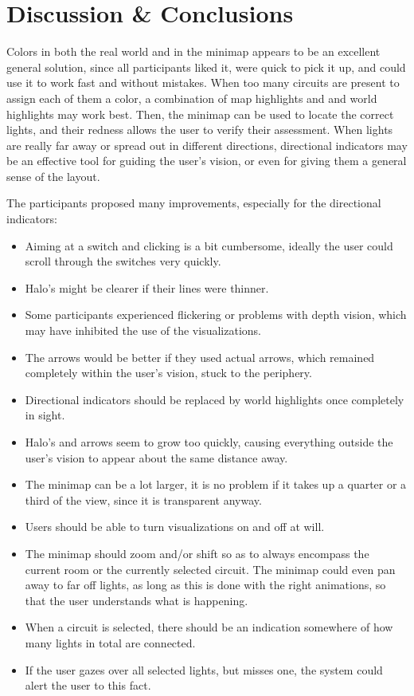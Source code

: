 \section{Discussion \& Conclusions} \label{sec:user:disc_conc}
Colors in both the real world and in the minimap appears to be an excellent general solution, since all participants liked it, were quick to pick it up, and could use it to work fast and without mistakes. When too many circuits are present to assign each of them a color, a combination of map highlights and and world highlights may work best. Then, the minimap can be used to locate the correct lights, and their redness allows the user to verify their assessment. When lights are really far away or spread out in different directions, directional indicators may be an effective tool for guiding the user's vision, or even for giving them a general sense of the layout.

The participants proposed many improvements, especially for the directional indicators:
\begin{itemize}
  \item Aiming at a switch and clicking is a bit cumbersome, ideally the user could scroll through the switches very quickly.
  \item Halo's might be clearer if their lines were thinner.
  \item Some participants experienced flickering or problems with depth vision, which may have inhibited the use of the visualizations.
  \item The arrows would be better if they used actual arrows, which remained completely within the user's vision, stuck to the periphery.
  \item Directional indicators should be replaced by world highlights once completely in sight.
  \item Halo's and arrows seem to grow too quickly, causing everything outside the user's vision to appear about the same distance away.
  \item The minimap can be a lot larger, it is no problem if it takes up a quarter or a third of the view, since it is transparent anyway.
  \item Users should be able to turn visualizations on and off at will.
  \item The minimap should zoom and/or shift so as to always encompass the current room or the currently selected circuit. The minimap could even pan away to far off lights, as long as this is done with the right animations, so that the user understands what is happening.
  \item When a circuit is selected, there should be an indication somewhere of how many lights in total are connected.
  \item If the user gazes over all selected lights, but misses one, the system could alert the user to this fact.
\end{itemize}

